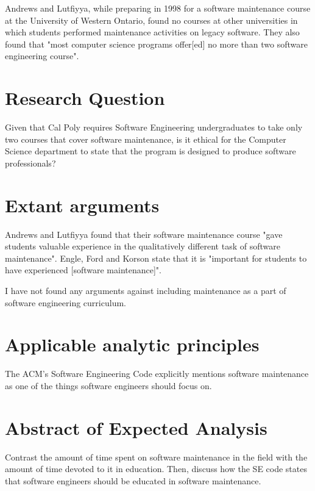 \documentclass[12pt]{article}
\begin{document}
Andrews and Lutfiyya, while preparing in 1998 for a software maintenance course at the University of Western Ontario, found no courses at other universities in which students performed maintenance activities on legacy software. \cite{Andrews:2000:ERS:794188.794320} They also found that "most computer science programs offer[ed] no more than two software engineering course". \cite{Andrews:2000:ERS:794188.794320}

\section{Research Question}
Given that Cal Poly requires Software Engineering undergraduates to take only two courses that cover software maintenance, is it ethical for the Computer Science department to state that the program is designed to produce software professionals?

\section{Extant arguments}
Andrews and Lutfiyya found that their software maintenance course "gave students valuable experience in the qualitatively different task of software maintenance". \cite{Andrews:2000:ERS:794188.794320}  Engle, Ford and Korson state that it is "important for students to have experienced [software maintenance]". \cite{engle}

I have not found any arguments against including maintenance as a part of software engineering curriculum.

\section{Applicable analytic principles}
The ACM's Software Engineering Code explicitly mentions software maintenance as one of the things software engineers should focus on. \cite{secode}

\section{Abstract of Expected Analysis}
Contrast the amount of time spent on software maintenance in the field with the amount of time devoted to it in education.  Then, discuss how the SE code states that software engineers should be educated in software maintenance.
\end{document}
